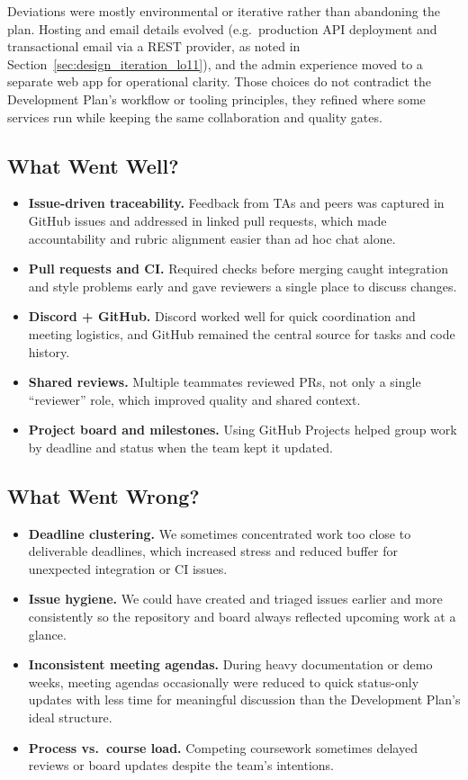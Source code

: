 \documentclass{article}
\begin{document}
Deviations were mostly environmental or iterative rather than abandoning the plan. Hosting and email details evolved (e.g.\ production API deployment and transactional email via a REST provider, as noted in Section~\ref{sec:design_iteration_lo11}), and the admin experience moved to a separate web app for operational clarity. Those choices do not contradict the Development Plan's workflow or tooling principles, they refined where some services run while keeping the same collaboration and quality gates.

\subsection{What Went Well?}

\begin{itemize}
  \item \textbf{Issue-driven traceability.} Feedback from TAs and peers was captured in GitHub issues and addressed in linked pull requests, which made accountability and rubric alignment easier than ad hoc chat alone.
  \item \textbf{Pull requests and CI.} Required checks before merging caught integration and style problems early and gave reviewers a single place to discuss changes.
  \item \textbf{Discord + GitHub.} Discord worked well for quick coordination and meeting logistics, and GitHub remained the central source for tasks and code history.
  \item \textbf{Shared reviews.} Multiple teammates reviewed PRs, not only a single ``reviewer'' role, which improved quality and shared context.
  \item \textbf{Project board and milestones.} Using GitHub Projects helped group work by deadline and status when the team kept it updated.
\end{itemize}

\subsection{What Went Wrong?}

\begin{itemize}
  \item \textbf{Deadline clustering.} We sometimes concentrated work too close to deliverable deadlines, which increased stress and reduced buffer for unexpected integration or CI issues.
  \item \textbf{Issue hygiene.} We could have created and triaged issues earlier and more consistently so the repository and board always reflected upcoming work at a glance.
  \item \textbf{Inconsistent meeting agendas.} During heavy documentation or demo weeks, meeting agendas occasionally were reduced to quick status-only updates with less time for meaningful discussion than the Development Plan's ideal structure.
  \item \textbf{Process vs.\ course load.} Competing coursework sometimes delayed reviews or board updates despite the team's intentions.
\end{itemize}
\end{document}

